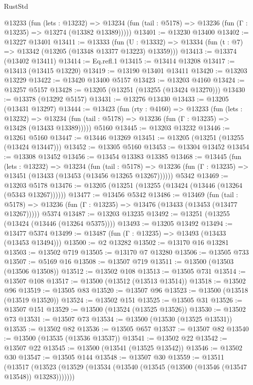 \begin{lexlean}{RustStd}
\begin{coremodule}
    @13233
      (fun (lets : @13232) =>
      @13234 (fun (tail : @5178) => @13236 (fun (Γ : @13235) => @13274 (@13382 @13389)))))
@13401 := @13230 @13400
@13402 := @13227 @13401
@13411 := @13333
    (fun (U : @13332) => @13334 (fun (t : @7) => @13342 (@13205 (@13348 @13377 @13223) @13359)))
@13413 := @13374 (@13402 @13411)
@13414 := Eq.refl.{1}
@13415 := @13414 @13208
@13417 := @13413 (@13415 @13220)
@13419 := @13190 @13401 @13411
@13420 := @13203 @13229
@13422 := @13420 @13400 @5157
@13423 := @13203 @4160
@13424 := @13257 @5157
@13428 := @13205 (@13251 (@13255 (@13424 @13270)))
@13430 := @13378 (@13292 @5157)
@13431 := @13276 @13430
@13433 := @13205 (@13431 @13297)
@13444 := @13423
    (fun (rty : @4160) =>
    @13233
      (fun (lets : @13232) =>
      @13234 (fun (tail : @5178) => @13236 (fun (Γ : @13235) => @13428 (@13433 @13389)))))
    @5160
@13445 := @13203 @13232
@13446 := @13261 @5160
@13447 := @13446 @13269
@13451 := @13205 (@13251 (@13255 (@13424 @13447)))
@13452 := @13305 @5160
@13453 := @13304 @13452
@13454 := @13308 @13452
@13456 := @13454 @13383 @13385
@13468 := @13445
    (fun (lets : @13232) =>
    @13234
      (fun (tail : @5178) =>
      @13236 (fun (Γ : @13235) => @13451 (@13433 (@13453 (@13456 @13265 @13267))))))
    @5342
@13469 := @13203 @5178
@13476 := @13205 (@13251 (@13255 (@13424 (@13446 (@13264 (@5343 @13267))))))
@13477 := @13456 @5342
@13486 := @13469
    (fun (tail : @5178) => @13236 (fun (Γ : @13235) => @13476 (@13433 (@13453 (@13477 @13267)))))
    @5374
@13487 := @13203 @13235
@13492 := @13251 (@13255 (@13424 (@13446 (@13264 @5375))))
@13493 := @13205 @13492
@13494 := @13477 @5374
@13499 := @13487 (fun (Γ : @13235) => @13493 (@13433 (@13453 @13494)))
@13500 := @2 @13282
@13502 := @13170 @16 @13281
@13503 := @13502 @719
@13505 := @13170 @7 @13280
@13506 := @13505 @733
@13507 := @5169 @16
@13508 := @13507 @719
@13511 := @13500 (@13503 (@13506 @13508))
@13512 := @13502 @108
@13513 := @13505 @731
@13514 := @13507 @108
@13517 := @13500 (@13512 (@13513 @13514))
@13518 := @13502 @96
@13519 := @13505 @83
@13520 := @13507 @96
@13523 := @13500 (@13518 (@13519 @13520))
@13524 := @13502 @151
@13525 := @13505 @31
@13526 := @13507 @151
@13529 := @13500 (@13524 (@13525 @13526))
@13530 := @13502 @73
@13531 := @13507 @73
@13534 := @13500 (@13530 (@13525 @13531))
@13535 := @13502 @82
@13536 := @13505 @657
@13537 := @13507 @82
@13540 := @13500 (@13535 (@13536 @13537))
@13541 := @13502 @22
@13542 := @13507 @22
@13545 := @13500 (@13541 (@13525 @13542))
@13546 := @13502 @30
@13547 := @13505 @144
@13548 := @13507 @30
@13559 := @13511
    (@13517 (@13523 (@13529 (@13534 (@13540 (@13545 (@13500 (@13546 (@13547 @13548)) @13283)))))))

\end{coremodule}
\end{lexlean}
